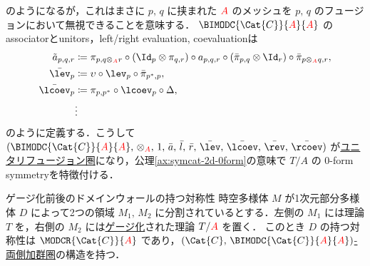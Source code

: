 \documentclass[TQFT_main]{subfiles}
\begin{document}
のようになるが，これはまさに $p,\, q$ に挟まれた $\textcolor{red}{A}$ のメッシュを $p,\, q$ のフュージョンにおいて無視できることを意味する．
$\BIMODC{\Cat{C}}{\textcolor{red}{A}}{\textcolor{red}{A}}$ のassociatorとunitors，left/right evaluation, coevaluationは
\begin{align}
    \tilde{a}_{p,q,r} &\coloneqq \pi_{p,q\otimes_{\textcolor{red}{A}} r} \circ (\Id_{p} \otimes \pi_{q,r}) \circ a_{p,q,r} \circ (\bar{\pi}_{p,q} \otimes \Id_{r}) \circ \bar{\pi}_{p \otimes_{\textcolor{red}{A}} q, r}, \\
    \bar{\lev}_p &\coloneqq \upsilon \circ \lev_p \circ \bar{\pi}_{p^*,p}, \\
    \bar{\lcoev}_p &\coloneqq \pi_{p,p^*} \circ \lcoev_p \circ \Delta, \\
    &\vdots 
\end{align}
のように定義する．こうして $(\BIMODC{\Cat{C}}{\textcolor{red}{A}}{\textcolor{red}{A}},\, \otimes_{\textcolor{red}{A}},\, 1,\, \bar{a},\, \bar{l},\, \bar{r},\, \bar{\lev},\, \bar{\lcoev},\, \bar{\rev},\, \bar{\rcoev})$ が\hyperref[def:tensorfusion-cat]{ユニタリフュージョン圏}になり，公理\ref{ax:symcat-2d-0form}の意味で $T/A$ の $0$-form symmetryを特徴付ける．

\begin{myprop}[label=prop:domainwall-gauged]{ゲージ化前後のドメインウォールの持つ対称性}
    時空多様体 $M$ が1次元部分多様体 $D$ によって2つの領域 $M_1,\, M_2$ に分割されているとする．左側の $M_1$ には理論 $T$ を，右側の $M_2$ には\hyperref[def:gauging]{ゲージ化}された理論 $T/\textcolor{red}{A}$ を置く．
    このとき $D$ の持つ対称性は $\MODCR{\Cat{C}}{\textcolor{red}{A}}$ であり，\hyperref[def:modulecat]{$(\Cat{C},\, \BIMODC{\Cat{C}}{\textcolor{red}{A}}{\textcolor{red}{A}})$-両側加群圏}の構造を持つ．
\end{myprop}
\end{document}
